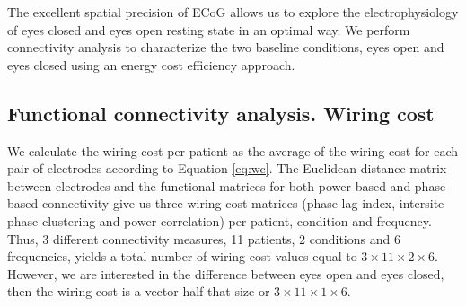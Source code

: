 \documentclass[11pt, onecolumn]{article}
\begin{document}
The excellent spatial precision of ECoG allows us to explore the electrophysiology of eyes closed and eyes open resting state in an optimal way. 
We perform connectivity analysis to characterize the two baseline conditions, eyes open and eyes closed using an energy cost efficiency approach. 
\subsection{Functional connectivity analysis. Wiring cost}
We calculate the wiring cost per patient as the average of the wiring cost for each pair of electrodes according to Equation \ref{eq:wc}. The Euclidean distance matrix between electrodes and the functional matrices for both power-based and phase-based connectivity give us three wiring cost matrices (phase-lag index, intersite phase clustering and power correlation) per patient, condition and frequency. Thus, 3 different connectivity measures, 11 patients, 2 conditions and 6 frequencies, yields a total number of wiring cost values equal to $3\times 11 \times 2 \times 6$. However, we are interested in the difference between eyes open and eyes closed, then the wiring cost is a vector half that size or $3\times 11 \times 1 \times 6$.
\end{document}
